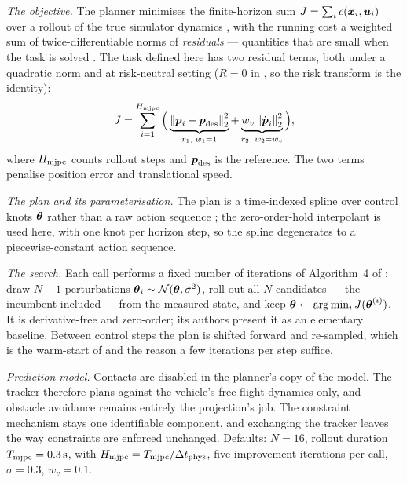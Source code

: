 \emph{The objective.} The planner minimises the finite-horizon sum
$J = \sum_{i} c(\boldsymbol{x}_{i},\boldsymbol{u}_{i})$ over a rollout of the true simulator dynamics
\parencite[Eq.~(3)]{howell2022predictive}, with the running cost a weighted sum of twice-differentiable
norms of \emph{residuals} --- quantities that are small when the task is solved
\parencite[Eq.~(4)]{howell2022predictive}. The task defined here has two residual terms, both under a
quadratic norm and at risk-neutral setting ($R = 0$ in
\parencite[Eq.~(5)]{howell2022predictive}, so the risk transform is the identity):
\begin{equation}\label{eq:method:dep:mjpc}
  J = \sum_{i=1}^{H_{\textrm{mjpc}}}
      \Big(\underbrace{\left\|\boldsymbol{p}_{i}-\boldsymbol{p}_{\textrm{des}}\right\|_{2}^{2}}_{r_{1},\;w_{1}=1}
      + \underbrace{w_{v}\left\|\dot{\boldsymbol{p}}_{i}\right\|_{2}^{2}}_{r_{2},\;w_{2}=w_{v}}\Big),
\end{equation}
where $H_{\textrm{mjpc}}$ counts rollout steps and $\boldsymbol{p}_{\textrm{des}}$ is the reference.
The two terms penalise position error and translational speed.

\emph{The plan and its parameterisation.} The plan is a time-indexed spline over control knots
$\boldsymbol{\theta}$ rather than a raw action sequence \parencite[\S3.3]{howell2022predictive}; the
zero-order-hold interpolant is used here, with one knot per horizon step, so the spline degenerates
to a piecewise-constant action sequence.

\emph{The search.} Each call performs a fixed number of iterations of Algorithm~4 of
\parencite{howell2022predictive}: draw $N-1$ perturbations
$\boldsymbol{\theta}_{i} \sim \mathcal{N}(\boldsymbol{\theta},\sigma^{2})$, roll out all $N$ candidates --- the
incumbent included --- from the measured state, and keep
$\boldsymbol{\theta} \leftarrow \arg\min_{i} J(\boldsymbol{\theta}^{(i)})$. It is derivative-free and zero-order;
its authors present it as an elementary baseline. Between control steps the plan is shifted forward
and re-sampled, which is the warm-start of
\parencite[Alg.~1]{howell2022predictive} and the reason a few iterations per step suffice.

\emph{Prediction model.} Contacts are disabled in the planner's copy of the model. The
tracker therefore plans against the vehicle's free-flight dynamics only, and obstacle avoidance
remains entirely the projection's job. The constraint mechanism stays one identifiable component,
and exchanging the tracker leaves the way constraints are enforced unchanged.
Defaults: $N = 16$, rollout duration $T_{\textrm{mjpc}} = 0.3\,\textrm{s}$, with
$H_{\textrm{mjpc}}=T_{\textrm{mjpc}}/\Delta t_{\textrm{phys}}$, five improvement iterations
per call, $\sigma = 0.3$, $w_{v} = 0.1$.

